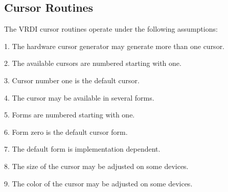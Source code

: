 \subsection{Cursor Routines}
The VRDI cursor routines operate under the following assumptions:

1.  The hardware cursor generator may generate more than one cursor.

2.  The available cursors are numbered starting with one.

3.  Cursor number one is the default cursor.

4.  The cursor may be available in several forms.

5.  Forms are numbered starting with one.

6.  Form zero is the default cursor form.

7.  The default form is implementation dependent.

8.  The size of the cursor may be adjusted on some devices.

9.  The color of the cursor may be adjusted on some devices.
\newpage
